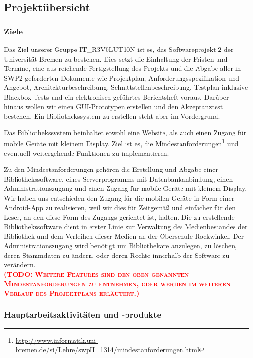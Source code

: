 \documentclass[fontsize=12pt,paper=a4,twoside]{scrartcl}
\newcommand{\todo}[1]{\textbf{\textsc{\textcolor{red}{(TODO: #1)}}}}
\begin{document}
\subsection{Projektübersicht}


\subsubsection{Ziele}

Das Ziel unserer Gruppe IT\_R3V0LUT10N ist es, das Softwareprojekt 2 der Universität Bremen zu bestehen. Dies setzt die Einhaltung der Fristen und Termine, eine aus-reichende Fertigstellung des Projekts und die Abgabe aller in SWP2 geforderten Dokumente wie Projektplan, Anforderungsspezifikation und Angebot, Architekturbeschreibung, Schnittstellenbeschreibung, Testplan inklusive Blackbox-Tests und ein elektronisch geführtes Berichtsheft voraus. Darüber hinaus wollen wir einen GUI-Prototypen erstellen und den Akzeptanztest bestehen. Ein Bibliothekssystem zu erstellen steht aber im Vordergrund.

Das Bibliothekssystem beinhaltet sowohl eine Website, als auch einen Zugang für mobile Geräte mit kleinem Display. Ziel ist es, die \label{sec:minreq}Mindestanforderungen\footnote{\url{http://www.informatik.uni-bremen.de/st/Lehre/swpII_1314/mindestanforderungen.html}} und eventuell weitergehende Funktionen zu implementieren.

Zu den Mindestanforderungen gehören die Erstellung und Abgabe einer Bibliothekssoftware, eines Serverprogramms mit Datenbankanbindung, einen Administrationszugang und einen Zugang für mobile Geräte mit kleinem Display. Wir haben uns entschieden den Zugang für die mobilen Geräte in Form einer Android-App zu realisieren, weil wir dies für Zeitgemäß und einfacher für den Leser, an den diese Form des Zugangs gerichtet ist, halten. Die zu erstellende Bibliothekssoftware dient in erster Linie zur Verwaltung des Medienbestandes der Bibliothek und dem Verleihen dieser Medien an der Oberschule Rockwinkel. Der Administrationszugang wird benötigt um Bibliothekare anzulegen, zu löschen, deren Stammdaten zu ändern, oder deren Rechte innerhalb der Software zu verändern.\\ \todo{Weitere Features sind den oben genannten Mindestanforderungen zu entnehmen, oder werden im weiteren Verlauf des Projektplans erläutert.}

\subsubsection{Hauptarbeitsaktivitäten und -produkte}
\end{document}
